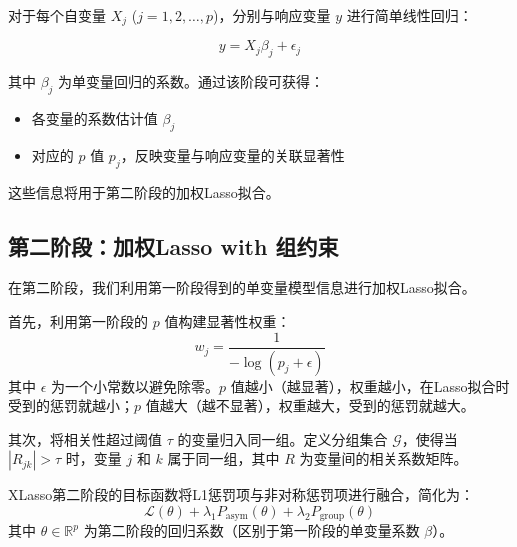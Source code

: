 \documentclass[12pt,a4paper]{article}
\begin{document}
对于每个自变量 $X_j$ ($j = 1, 2, \dots, p$)，分别与响应变量 $y$ 进行简单线性回归：

\begin{equation}
    y = X_j \beta_j + \epsilon_j
\end{equation}

其中 $\beta_j$ 为单变量回归的系数。通过该阶段可获得：
\begin{itemize}
    \item 各变量的系数估计值 $\beta_j$
    \item 对应的 $p$ 值 $p_j$，反映变量与响应变量的关联显著性
\end{itemize}

这些信息将用于第二阶段的加权Lasso拟合。

\subsection{第二阶段：加权Lasso with 组约束}

在第二阶段，我们利用第一阶段得到的单变量模型信息进行加权Lasso拟合。

首先，利用第一阶段的 $p$ 值构建显著性权重：
\begin{equation}
    w_j = \frac{1}{-\log(p_j + \epsilon)}
\end{equation}
其中 $\epsilon$ 为一个小常数以避免除零。$p$ 值越小（越显著），权重越小，在Lasso拟合时受到的惩罚就越小；$p$ 值越大（越不显著），权重越大，受到的惩罚就越大。

其次，将相关性超过阈值 $\tau$ 的变量归入同一组。定义分组集合 $\mathcal{G}$，使得当 $|R_{jk}| > \tau$ 时，变量 $j$ 和 $k$ 属于同一组，其中 $R$ 为变量间的相关系数矩阵。

XLasso第二阶段的目标函数将L1惩罚项与非对称惩罚项进行融合，简化为：
\begin{equation}
    \mathcal{L}(\theta) + \lambda_1 P_{\text{asym}}(\theta) + \lambda_2 P_{\text{group}}(\theta)
\end{equation}
其中 $\theta \in \mathbb{R}^p$ 为第二阶段的回归系数（区别于第一阶段的单变量系数 $\beta$）。
\end{document}
